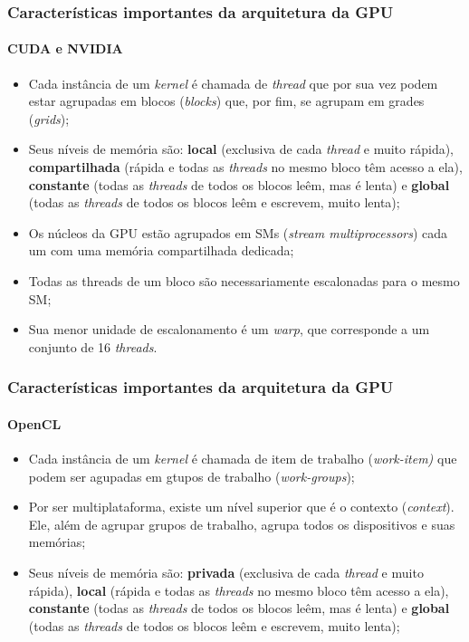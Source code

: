 \documentclass[brazil, 10pt]{beamer}
\begin{document}
\begin{frame}
  \frametitle{Características importantes da arquitetura da GPU}
  \framesubtitle{CUDA e NVIDIA}
  
  \begin{itemize}
    \item Cada instância de um \textit{kernel} é chamada de \textit{thread} que por sua vez podem estar agrupadas em blocos (\textit{blocks}) que, por fim, se agrupam em grades (\textit{grids});
    \item Seus níveis de memória são: \textbf{local} (exclusiva de cada \textit{thread} e muito rápida), \textbf{compartilhada} (rápida e todas as \textit{threads} no mesmo bloco têm acesso a ela), \textbf{constante} (todas as \textit{threads} de todos os blocos leêm, mas é lenta) e \textbf{global} (todas as \textit{threads} de todos os blocos leêm e escrevem, muito lenta);
    \item Os núcleos da GPU estão agrupados em SMs (\textit{stream multiprocessors}) cada um com uma memória compartilhada dedicada;
    \item Todas as threads de um bloco são necessariamente escalonadas para o mesmo SM;
    \item Sua menor unidade de escalonamento é um \textit{warp}, que corresponde a um conjunto de 16 \textit{threads}.
  \end{itemize}

\end{frame}

\begin{frame}
  \frametitle{Características importantes da arquitetura da GPU}
  \framesubtitle{OpenCL}
  
  \begin{itemize}
    \item Cada instância de um \textit{kernel} é chamada de item de trabalho (\textit{work-item)} que podem ser agupadas em gtupos de trabalho (\textit{work-groups});
    \item Por ser multiplataforma, existe um nível superior que é o contexto (\textit{context}). Ele, além de agrupar grupos de trabalho, agrupa todos os dispositivos e suas memórias;
    \item Seus níveis de memória são: \textbf{privada} (exclusiva de cada \textit{thread} e muito rápida), \textbf{local} (rápida e todas as \textit{threads} no mesmo bloco têm acesso a ela), \textbf{constante} (todas as \textit{threads} de todos os blocos leêm, mas é lenta) e \textbf{global} (todas as \textit{threads} de todos os blocos leêm e escrevem, muito lenta);
  \end{itemize}

\end{frame}
\end{document}
